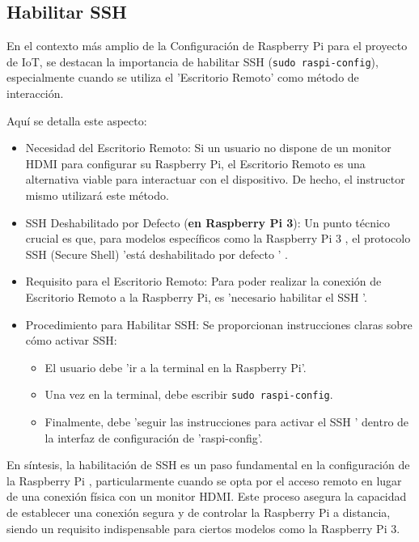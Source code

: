 \documentclass{report}
\begin{document}
\subsection{Habilitar SSH}
En el contexto más amplio de la  Configuración de Raspberry Pi  para el proyecto de IoT, se destacan la 
importancia de  habilitar SSH (\verb|sudo raspi-config|), especialmente cuando se utiliza el 'Escritorio Remoto' como método de interacción.

Aquí se detalla este aspecto:
\begin{itemize}
    \item Necesidad del Escritorio Remoto:  Si un usuario no dispone de un monitor HDMI para configurar su Raspberry Pi, el  Escritorio Remoto  es 
    una alternativa viable para interactuar con el dispositivo. De hecho, el instructor mismo utilizará este método.
    \item SSH Deshabilitado por Defecto (\textbf{en Raspberry Pi 3}):  Un punto técnico crucial es que, para modelos específicos como la  Raspberry Pi 3 , el 
    protocolo SSH (Secure Shell)   'está deshabilitado por defecto ' .
    \item Requisito para el Escritorio Remoto:  Para poder realizar la conexión de Escritorio Remoto a la Raspberry Pi, es 'necesario habilitar el SSH '.
    \item Procedimiento para Habilitar SSH:  Se proporcionan instrucciones claras sobre cómo activar SSH:
    \begin{itemize}
        \item El usuario debe 'ir a la terminal en la Raspberry Pi'.
        \item Una vez en la terminal, debe escribir \verb|sudo raspi-config|.
        \item Finalmente, debe   'seguir las instrucciones para activar el SSH '  dentro de la interfaz de configuración de 'raspi-config'.
    \end{itemize}
\end{itemize}
En síntesis, la habilitación de SSH es un paso fundamental en la  configuración de la Raspberry Pi , particularmente cuando se opta por el acceso remoto en 
lugar de una conexión física con un monitor HDMI. Este proceso asegura la capacidad de establecer una conexión segura y de controlar la Raspberry 
Pi a distancia, siendo un requisito indispensable para ciertos modelos como la Raspberry Pi 3.
\end{document}
